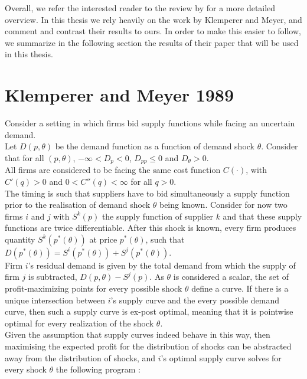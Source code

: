 Overall, we refer the interested reader to the review by \cite{ventosa2005electricity} for a more detailed overview. In this thesis we rely heavily on the work by Klemperer and Meyer, and comment and contrast their results to ours. In order to make this easier to follow, we summarize in the following section the results of their paper that will be used in this thesis.

\section*{Klemperer and Meyer 1989}
Consider a setting in which firms bid supply functions while facing an uncertain demand. \\

Let $D(p,\theta)$ be the demand function as a function of demand shock $\theta$. Consider that for all $(p,\theta)$, $-\infty<D_p<0$, $D_{pp}\leq 0$ and $D_\theta>0$.\\

All firms are considered to be facing the same cost function $C(\cdot)$, with $C'(q)>0$ and $0<C''(q)<\infty$ for all $q>0$.\\

The timing is such that suppliers have to bid simultaneously a supply function prior to the realisation of demand shock $\theta$ being known. Consider for now two firms $i$ and $j$ with $S^k(p)$ the supply function of supplier $k$ and that these supply functions are twice differentiable. After this shock is known, every firm produces quantity $S^k(p^*(\theta))$ at price $p^*(\theta)$, such that $D(p^*(\theta)) = S^i(p^*(\theta)) + S^j(p^*(\theta))$.\\

Firm $i$'s residual demand is given by the total demand from which the supply of firm $j$ is subtracted, $D(p,\theta) - S^j(p)$. As $\theta$ is considered a scalar, the set of profit-maximizing points for every possible shock $\theta$ define a curve. If there is a unique intersection between $i$'s supply curve and the every possible demand curve, then such a supply curve is ex-post optimal, meaning that it is pointwise optimal for every realization of the shock $\theta$. \\

Given the assumption that supply curves indeed behave in this way, then maximising the expected profit for the distribution of shocks can be abstracted away from the distribution of shocks, and $i$'s optimal supply curve solves for every shock $\theta$ the following program :

